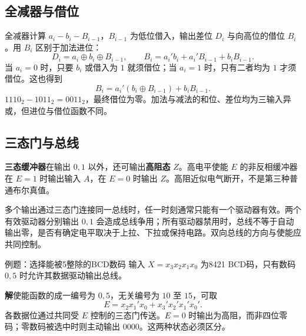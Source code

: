 \documentclass[UTF8,fontset=none,zihao=-4,a4paper]{ctexart}
\newcommand{\term}[1]{\textbf{#1}}
\newcommand{\sol}{\par\noindent\textbf{解}\quad}
\begin{document}
\subsection{全减器与借位}
全减器计算 $a_i-b_i-B_{i-1}$，$B_{i-1}$ 为低位借入，输出差位 $D_i$ 与向高位的借位 $B_i$。用 $B_i$ 区别于加法进位：
\[
D_i=a_i\oplus b_i\oplus B_{i-1},\qquad
B_i=a_i'b_i+a_i'B_{i-1}+b_iB_{i-1}.
\]
当 $a_i=0$ 时，只要 $b_i$ 或借入为 $1$ 就须借位；当 $a_i=1$ 时，只有二者均为 $1$ 才须借位。这也得到
\[
B_i=a_i'(b_i\oplus B_{i-1})+b_iB_{i-1}.
\]
$1110_2-1011_2=0011_2$，最终借位为零。加法与减法的和位、差位均为三输入异或，但进位与借位函数不同。

\subsection{三态门与总线}
\term{三态缓冲器}在输出 $0,1$ 以外，还可输出\term{高阻态} $Z$。高电平使能 $E$ 的非反相缓冲器在 $E=1$ 时输出输入 $A$，在 $E=0$ 时输出 $Z$。高阻近似电气断开，不是第三种普通布尔真值。

多个输出通过三态门连接同一总线时，任一时刻通常只能有一个驱动器有效。两个有效驱动器分别输出 $0,1$ 会造成总线争用；所有驱动器禁用时，总线不等于自动输出零，是否有确定电平取决于上拉、下拉或保持电路。双向总线的方向与使能应共同控制。

\begin{infobox}{例题：选择能被5整除的BCD数码}
输入 $X=x_3x_2x_1x_0$ 为8421 BCD码，只有数码 $0,5$ 时允许其数据驱动输出总线。
\end{infobox}
\sol 使能函数的成一编号为 $0,5$，无关编号为 $10$ 至 $15$，可取
\[
E=x_2x_1'x_0+x_3'x_2'x_1'x_0'.
\]
各数据位通过共同受 $E$ 控制的三态门传送。$E=0$ 时输出为高阻，而非四位零码；零数码被选中时则主动输出 $0000$。这两种状态必须区分。
\end{document}
